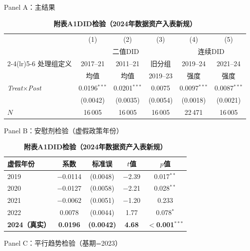\documentclass[11pt,a4paper]{article}
\newcommand{\hei}{\CJKfamily{hei}}
\begin{document}
\FloatBarrier

\begin{table}[htbp]
\centering
\caption*{{\bf 附表A1\quad DID检验（2024年数据资产入表新规）}}
\label{tab:did}
\small

\vspace{4pt}
{\hei Panel A：主结果}
\vspace{4pt}

\begin{tabular}{l*{5}{c}}
\toprule
 & (1) & (2) & (3) & (4) & (5) \\
 & \multicolumn{3}{c}{二值DID} & \multicolumn{2}{c}{连续DID} \\
\cmidrule(lr){2-4}\cmidrule(lr){5-6}
处理组定义 & 2017--21 & 2011--21 & 旧分组 & 2019--24 & 2021--24 \\
 & 均值 & 均值 & 2019--23 & 强度 & 强度 \\
\midrule
\textit{Treat}$\times$\textit{Post}
 & 0.0196$^{***}$ & 0.0201$^{***}$ & 0.0075 & 0.0097$^{***}$ & 0.0087$^{***}$ \\
 & (0.0042) & (0.0035) & (0.0054) & (0.0018) & (0.0021) \\[4pt]
\midrule
$N$ & 16\,005 & 16\,005 & 16\,005 & 22\,471 & 16\,005 \\
\bottomrule
\end{tabular}

\vspace{14pt}
{\hei Panel B：安慰剂检验（虚假政策年份）}
\vspace{4pt}

\begin{tabular}{lcccc}
\toprule
虚假年份 & 系数 & 标准误 & $t$值 & $p$值 \\
\midrule
2019 & $-$0.0114 & (0.0048) & $-$2.39 & 0.017$^{**}$ \\
2020 & $-$0.0127 & (0.0058) & $-$2.21 & 0.028$^{**}$ \\
2021 & $-$0.0062 & (0.0051) & $-$1.20 & 0.233 \\
2022 & 0.0078 & (0.0044) & 1.77 & 0.078$^{*}$ \\
\textbf{2024（真实）} & \textbf{0.0196} & \textbf{(0.0042)} & \textbf{4.68} & $<$\textbf{0.001}$^{***}$ \\
\bottomrule
\end{tabular}

\vspace{14pt}
{\hei Panel C：平行趋势检验（基期=2023）}
\vspace{4pt}


\end{table}
\end{document}

